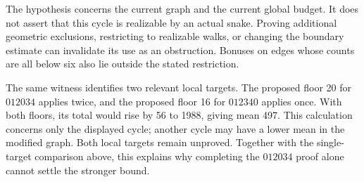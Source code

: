 The hypothesis concerns the current graph and the current global budget.
It does not assert that this cycle is realizable by an actual snake. Proving
additional geometric exclusions, restricting to realizable walks, or changing
the boundary estimate can invalidate its use as an obstruction. Bonuses on
edges whose counts are all below six also lie outside the stated restriction.

The same witness identifies two relevant local targets. The proposed floor
20 for $012034$ applies twice, and the proposed floor 16 for $012340$ applies
once. With both floors, its total would rise by 56 to 1988, giving mean 497.
This calculation concerns only the displayed cycle; another cycle may have
a lower mean in the modified graph. Both local targets remain unproved.
Together with the single-target comparison above, this explains why completing
the $012034$ proof alone cannot settle the stronger bound.
